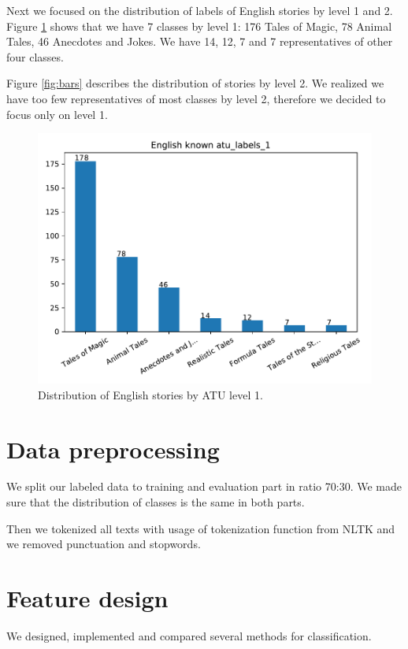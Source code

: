 \documentclass[a4paper]{article}
\begin{document}
Next we focused on the distribution of labels of English stories by level
1 and 2. Figure \ref{fig:bar3} shows that we have 7 classes by level 1:
176 Tales of Magic, 78 Animal Tales, 46 Anecdotes and Jokes. We have 14, 12,
7 and 7 representatives of other four classes.

Figure \ref{fig:bars} describes the distribution of stories by level 2. We
realized we have too few representatives of most classes by level 2, therefore
we decided to focus only on level 1.

\begin{figure}
\centering
\includegraphics[width=0.9\linewidth]{plots/bars3.pdf}
\caption{Distribution of English stories by ATU level 1.}
\label{fig:bar3}
\end{figure}



\section{Data preprocessing}

We split our labeled data to training and evaluation part in ratio
70:30. We made sure that the distribution of classes is the same in both parts.

Then we tokenized all texts with usage of tokenization function from NLTK
\cite{NLTK} and we removed punctuation and stopwords. 

\section{Feature design}

We designed, implemented and compared several methods for classification.
\end{document}
